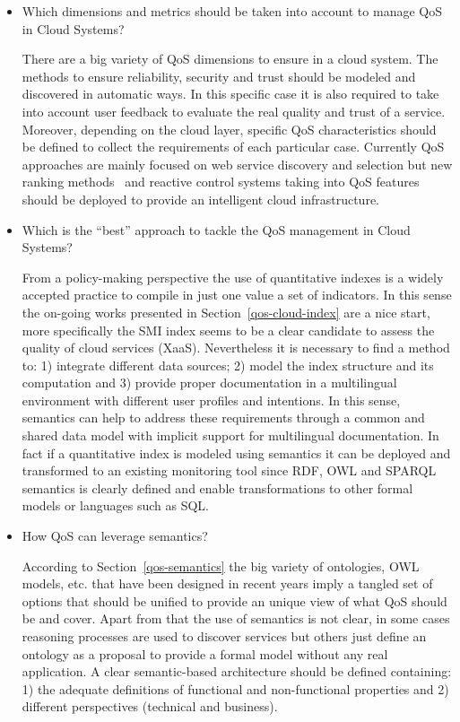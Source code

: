 \begin{itemize}

 \item Which dimensions and metrics should be taken into account to manage QoS in Cloud Systems?
 
There are a big variety of QoS dimensions to ensure in a cloud system. 
The methods to ensure reliability, security and trust should be modeled and 
discovered in automatic ways. In this specific case it is also required to take 
into account user feedback to evaluate the real quality and trust of a service. 
Moreover, depending on the cloud layer, specific QoS characteristics should be 
defined to collect the requirements of each particular case. Currently QoS 
approaches are mainly focused on web service discovery and selection but new 
ranking methods~\cite{DBLP:journals/fgcs/GargVB13} and reactive control systems taking into QoS features should be 
deployed to provide an intelligent cloud infrastructure.  

\item Which is the ``best'' approach to tackle the QoS management in Cloud Systems?

From a policy-making perspective the use of quantitative indexes is a widely accepted 
practice to compile in just one value a set of indicators. In this sense the on-going 
works presented in Section~\ref{qos-cloud-index} are a nice start, more specifically 
the SMI index seems to be a clear candidate to assess the quality of cloud services (XaaS). 
Nevertheless it is necessary to find a method to: 1) integrate different data sources; 
2) model the index structure and its computation and 3) provide proper documentation 
in a multilingual environment with different user profiles and intentions. In this sense, 
semantics can help to address these requirements through a common and shared data model 
with implicit support for multilingual documentation. In fact if a quantitative index 
is modeled using semantics it can be deployed and transformed to an existing monitoring 
tool since RDF, OWL and SPARQL semantics is clearly defined and enable transformations 
to other formal models or languages such as SQL.

\item How QoS can leverage semantics?

According to Section~\ref{qos-semantics} the big variety of ontologies, OWL models, etc. that 
have been designed in recent years imply a tangled set of options that should be 
unified to provide an unique view of what QoS should be and cover. Apart from that the 
use of semantics is not clear, in some cases reasoning processes are used to 
discover services but others just define an ontology as a proposal to provide a 
formal model without any real application. A clear semantic-based architecture 
should be defined containing: 1) the adequate definitions of 
functional and non-functional properties and 2) different perspectives (technical and business).


\end{itemize}
